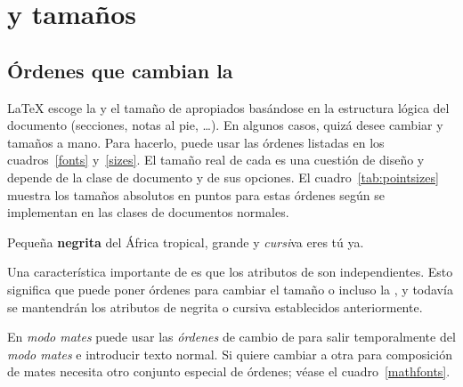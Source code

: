 \section{\Fontsnomo{} y tamaños}

\subsection{Órdenes que cambian la \fontnomo{}}
\index{\fontnomo{}} \LaTeX{} escoge la \fontnomo{} y el tamaño de \fontnomo{} apropiados basándose en la estructura lógica del documento (secciones, notas al pie, \ldots).   En algunos casos, quizá desee cambiar \fontsnomo{} y tamaños a mano.  Para hacerlo, puede usar las órdenes listadas en los cuadros~\ref{fonts} y~\ref{sizes}.  El tamaño real de cada \fontnomo{} es una cuestión de diseño y depende de la clase de documento y de sus opciones.  El cuadro~\ref{tab:pointsizes} muestra los tamaños absolutos en puntos para estas órdenes según se implementan en las clases de documentos normales.

\begin{example}
{\small Pequeña \textbf{negrita}
 del África tropical,}
{\Large grande y \textit{cursi}va
 eres tú ya.}
\end{example}

Una característica importante de \LaTeXe{} es que los atributos de \fontnomo{} son independientes.  Esto significa que puede poner órdenes para cambiar el tamaño o incluso la \fontnomo{}, y todavía se mantendrán los atributos de negrita o cursiva establecidos anteriormente.

En \emph{modo mates} puede usar las \emph{órdenes} de cambio de \fontnomo{} para salir temporalmente del \emph{modo mates} e introducir texto normal.  Si quiere cambiar a otra \fontnomo{} para composición de mates necesita otro conjunto especial de órdenes; véase el cuadro~\ref{mathfonts}.

